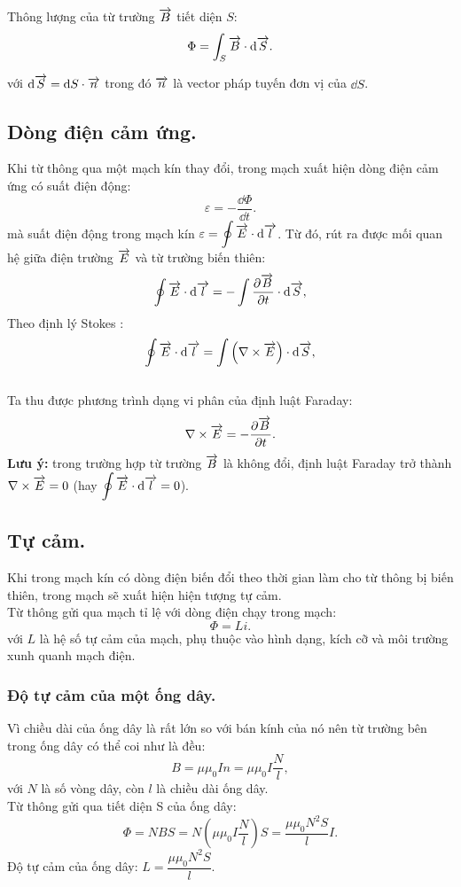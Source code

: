 \begin{appendices}
\begin{center}

\end{center}
    Thông lượng của từ trường $\overrightarrow{B}$ tiết diện $S$:
    $$\Phi=\int_S \overrightarrow{B}\cdot \mathrm{d} \overrightarrow{S}.$$
    
    với $\mathrm{d}\overrightarrow{S}=\mathrm{d} S\cdot \overrightarrow{n}$ trong đó $\overrightarrow{n}$ là vector pháp tuyến đơn vị của $\dd S$.
\subsection{Dòng điện cảm ứng.}
    Khi từ thông qua một mạch kín thay đổi, trong mạch xuất hiện dòng điện cảm ứng có suất điện động:
    $$\varepsilon=-\dfrac{\dd\Phi}{\dd t}.$$
    mà suất điện động trong mạch kín $\displaystyle \varepsilon=\oint \overrightarrow{E}\cdot\mathrm{d}\overrightarrow{l}$. Từ đó, rút ra được mối quan hệ giữa điện trường $\overrightarrow{E}$ và từ trường biến thiên:
    $$\oint \overrightarrow{E}\cdot \mathrm{d}\overrightarrow{l}=-\int \dfrac{\partial \overrightarrow{B}}{\partial t}\cdot \mathrm{d}\overrightarrow{S},$$
    Theo định lý Stokes : $$\oint \overrightarrow{E}\cdot \mathrm{d}\overrightarrow{l}=\int \left(\nabla \times \overrightarrow{E}\right) \cdot \mathrm{d}\overrightarrow{S},$$\\
    Ta thu được phương trình dạng vi phân của định luật Faraday:
    $$\nabla \times \overrightarrow{E}= - \dfrac{\partial \overrightarrow{B}}{\partial t}.$$
    \textbf{Lưu ý:} trong trường hợp từ trường $\overrightarrow{B}$ là không đổi, định luật Faraday trở thành $\nabla \times \overrightarrow{E}=0$ (hay $\displaystyle\oint \overrightarrow{E}\cdot \mathrm{d}\overrightarrow{l}=0$).
\subsection{Tự cảm.}
    Khi trong mạch kín có dòng điện biến đổi theo thời gian làm cho từ thông bị biến thiên, trong mạch sẽ xuất hiện hiện tượng tự cảm.\\
    Từ thông gửi qua mạch tỉ lệ với dòng điện chạy trong mạch:
    $$\Phi=Li.$$
    với $L$ là hệ số tự cảm của mạch, phụ thuộc vào hình dạng, kích cỡ và môi trường xunh quanh mạch điện.\\
\subsubsection{Độ tự cảm của một ống dây.}
    Vì chiều dài của ống dây là rất lớn so với bán kính của nó nên từ trường bên trong ống dây có thể coi như là đều:
    $$B=\mu\mu_0In=\mu\mu_0I\dfrac{N}{l},$$
    với $N$ là số vòng dây, còn $l$ là chiều dài ống dây.\\
    Từ thông gửi qua tiết diện S của ống dây:
    $$\Phi=NBS=N\left(\mu\mu_0I\dfrac{N}{l}\right)S=\dfrac{\mu\mu_0N^2S}{l}I.$$
    Độ tự cảm của ống dây: $L=\dfrac{\mu\mu_0N^2S}{l}.$

\end{appendices}
